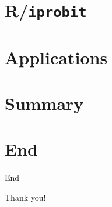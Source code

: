 \documentclass{beamer}
\begin{document}
\section{R/\texttt{iprobit}}
%

\section{Applications}
%

\section{Summary}
%

\section*{End}

{
\framenonumber
\begin{frame}[noframenumbering]{End}
\begin{center}
\Huge Thank you!
\end{center}
\end{frame}
}

\appendix


\end{document}
